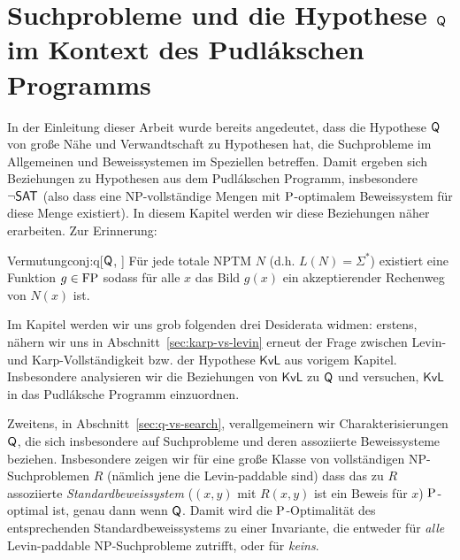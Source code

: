 \chapter{Suchprobleme und die Hypothese $\hQ$ im Kontext des Pudlákschen Programms}\label{chap:pudlak}


In der Einleitung dieser Arbeit wurde bereits angedeutet, dass die Hypothese $\hQ$ von \citeauthor{fenner_inverting_2003} große Nähe und Verwandtschaft zu Hypothesen hat, die Suchprobleme im Allgemeinen und Beweissystemen im Speziellen betreffen. Damit ergeben sich Beziehungen zu Hypothesen aus dem Pudlákschen Programm, insbesondere $\neg\hSAT$ (also dass eine NP-vollständige Mengen mit $\P$-optimalem Beweissystem für diese Menge existiert).
In diesem Kapitel werden wir diese Beziehungen näher erarbeiten. Zur Erinnerung:

\begin{reptheorem}{Vermutung}{conj:q}[$\hQ$, \cite{fenner_inverting_2003}]
    Für jede totale NPTM $N$ (d.h. $L(N)=\Sigma^*$) existiert eine Funktion $g\in\FP$ sodass für alle $x$ das Bild $g(x)$ ein akzeptierender Rechenweg von $N(x)$ ist. 
\end{reptheorem}

Im Kapitel werden wir uns grob folgenden drei Desiderata widmen: 
erstens, nähern wir uns in Abschnitt~\ref{sec:karp-vs-levin} erneut der Frage zwischen Levin- und Karp-Vollständigkeit bzw. der Hypothese $\mathsf{KvL}$ aus vorigem Kapitel. Insbesondere analysieren wir die Beziehungen von $\mathsf{KvL}$ zu $\hQ$ und versuchen, $\mathsf{KvL}$ in das Pudláksche Programm einzuordnen.

Zweitens, in Abschnitt~\ref{sec:q-vs-search}, verallgemeinern wir Charakterisierungen $\hQ$, die sich insbesondere auf Suchprobleme und deren assoziierte Beweissysteme beziehen.
Insbesondere zeigen wir für eine große Klasse von vollständigen NP-Suchproblemen $R$ (nämlich jene die Levin-paddable sind) dass das zu $R$ assoziierte \emph{Standardbeweissystem} ($(x,y)$ mit $R(x,y)$ ist ein Beweis für $x$) $\P$-optimal ist, genau dann wenn $\hQ$. Damit wird die $\P$-Optimalität des entsprechenden Standardbeweissystems zu einer Invariante, die entweder für \emph{alle} Levin-paddable NP-Suchprobleme zutrifft, oder für \emph{keins}.


